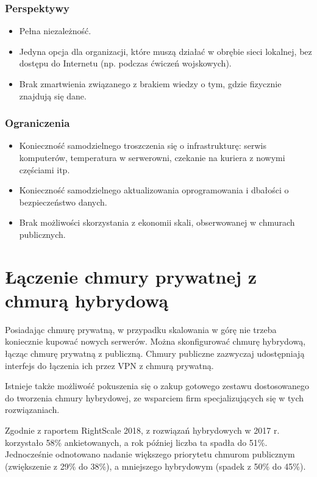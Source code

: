 \documentclass[12pt,a4paper,twoside,titlepage,openright]{book}
\begin{document}
\subsubsection{Perspektywy}
\begin{itemize}
\item Pełna niezależność.
\item Jedyna opcja dla organizacji, które muszą działać w obrębie sieci lokalnej, bez dostępu do Internetu (np. podczas ćwiczeń wojskowych).
\item Brak zmartwienia związanego z brakiem wiedzy o tym, gdzie fizycznie znajdują się dane.
\end{itemize}

\subsubsection{Ograniczenia}
\begin{itemize}
\item Konieczność samodzielnego troszczenia się o infrastrukturę: serwis komputerów, temperatura w serwerowni, czekanie na kuriera z nowymi częściami itp.
\item Konieczność samodzielnego aktualizowania oprogramowania i dbałości o bezpieczeństwo danych.
\item Brak możliwości skorzystania z ekonomii skali, obserwowanej w chmurach publicznych.
\end{itemize}

\section{Łączenie chmury prywatnej z chmurą hybrydową}

Posiadając chmurę prywatną, w przypadku skalowania w górę nie trzeba koniecznie kupować nowych serwerów. Można skonfigurować chmurę hybrydową, łącząc chmurę prywatną z publiczną. Chmury publiczne zazwyczaj udostępniają interfejs do łączenia ich przez VPN z chmurą prywatną.

Istnieje także możliwość pokuszenia się o zakup gotowego zestawu dostosowanego do tworzenia chmury hybrydowej, ze wsparciem firm specjalizujących się w tych rozwiązaniach.

Zgodnie z raportem RightScale 2018\cite{rightscaleReport}, z rozwiązań hybrydowych w 2017 r. korzystało 58\% ankietowanych, a rok później liczba ta spadła do 51\%. Jednocześnie odnotowano nadanie większego priorytetu chmurom publicznym (zwiększenie z 29\% do 38\%), a mniejszego hybrydowym (spadek z 50\% do 45\%).
\end{document}
